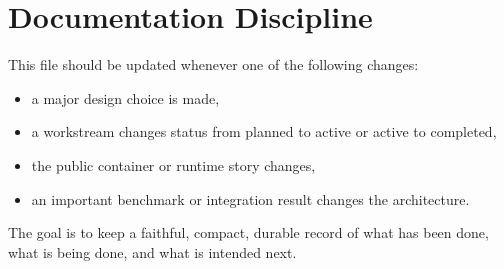 \documentclass[11pt]{article}
\begin{document}
\section{Documentation Discipline}
This file should be updated whenever one of the following changes:
\begin{itemize}
  \item a major design choice is made,
  \item a workstream changes status from planned to active or active to completed,
  \item the public container or runtime story changes,
  \item an important benchmark or integration result changes the architecture.
\end{itemize}
The goal is to keep a faithful, compact, durable record of what has been done, what is being done, and what is intended next.
\end{document}
